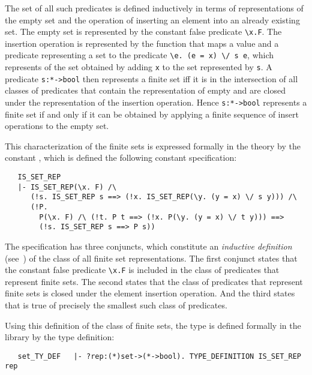 The set of all such predicates is defined inductively in terms of
representations of the empty set and the operation of inserting an element into
an already existing set.  The empty set is represented by the constant false
predicate {\small\verb!\x.F!}. The insertion operation is represented by the
function that maps a value  and a predicate  representing a set
to the predicate {\small\verb!\e. (e = x) \/ s e!}, which represents of the set
obtained by adding {\small\verb!x!} to the set represented by {\small\verb!s!}.
A predicate {\small\verb!s:*->bool!} then represents a finite set iff it is in
the intersection of all classes of predicates that contain the representation
of empty and are closed under the representation of the insertion operation.
Hence {\small\verb!s:*->bool!} represents a finite set if and only if it can be
obtained by applying a finite sequence of insert operations to the empty set.

This characterization of the finite sets is expressed formally in the
 theory by the constant , which is defined
the following constant specification:

\begin{hol}
\begin{verbatim}
   IS_SET_REP
   |- IS_SET_REP(\x. F) /\
      (!s. IS_SET_REP s ==> (!x. IS_SET_REP(\y. (y = x) \/ s y))) /\
      (!P.
        P(\x. F) /\ (!t. P t ==> (!x. P(\y. (y = x) \/ t y))) ==>
        (!s. IS_SET_REP s ==> P s))
\end{verbatim}\end{hol}

\noindent The specification has three conjuncts, which constitute an {\it
inductive definition\/} (see~\cite{ind-defs}) of the class of all finite set
representations.  The first conjunct states that the constant false predicate
{\small\verb!\x.F!} is included in the class of predicates that represent
finite sets.  The second states that the class of predicates that represent
finite sets is closed under the element insertion operation. And the third
states that \ml{IS\_SET\_REP} is true of precisely the smallest such class of
predicates.

Using this definition of the class of finite sets, the type  is
defined formally in the library by the type definition:

\begin{hol}
\begin{verbatim}
   set_TY_DEF   |- ?rep:(*)set->(*->bool). TYPE_DEFINITION IS_SET_REP rep
\end{verbatim}\end{hol}

